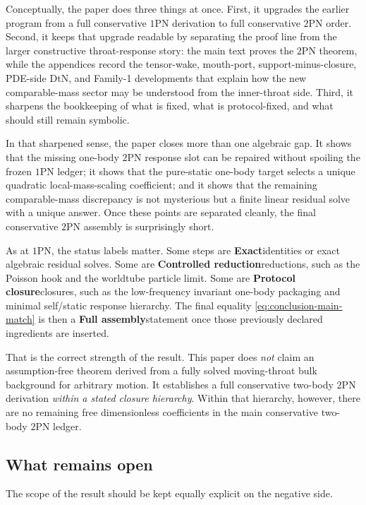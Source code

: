 \documentclass[11pt]{article}
\newcommand{\OnePN}{\mathrm{1PN}}
\newcommand{\TwoPN}{\mathrm{2PN}}
\newcommand{\DtN}{\mathrm{DtN}}
\newcommand{\Exact}{\textbf{Exact}}
\newcommand{\Controlled}{\textbf{Controlled reduction}}
\newcommand{\Protocol}{\textbf{Protocol closure}}
\newcommand{\FullMatch}{\textbf{Full assembly}}
\begin{document}
Conceptually, the paper does three things at once.
First, it upgrades the earlier program from a full conservative \(\OnePN\) derivation to
full conservative \(\TwoPN\) order.
Second, it keeps that upgrade readable by separating the proof line from the larger
constructive throat-response story: the main text proves the \(\TwoPN\) theorem, while
the appendices record the tensor-wake, mouth-port, support-minus-closure, PDE-side
\(\DtN\), and Family-1 developments that explain how the new comparable-mass sector may
be understood from the inner-throat side.
Third, it sharpens the bookkeeping of what is fixed, what is protocol-fixed, and what
should still remain symbolic.

In that sharpened sense, the paper closes more than one algebraic gap.
It shows that the missing one-body \(\TwoPN\) response slot can be repaired without
spoiling the frozen \(\OnePN\) ledger; it shows that the pure-static one-body target
selects a unique quadratic local-mass-scaling coefficient; and it shows that the
remaining comparable-mass discrepancy is not mysterious but a finite linear residual
solve with a unique answer.
Once these points are separated cleanly, the final conservative \(\TwoPN\) assembly is
surprisingly short.

As at \(\OnePN\), the status labels matter.
Some steps are \Exact identities or exact algebraic residual solves.
Some are \Controlled reductions, such as the Poisson hook and the worldtube particle
limit.
Some are \Protocol closures, such as the low-frequency invariant one-body packaging and
minimal self/static response hierarchy.
The final equality \cref{eq:conclusion-main-match} is then a \FullMatch statement once
those previously declared ingredients are inserted.

That is the correct strength of the result.
This paper does \emph{not} claim an assumption-free theorem derived from a fully solved
moving-throat bulk background for arbitrary motion.
It establishes a full conservative two-body \(\TwoPN\) derivation \emph{within a stated
closure hierarchy}.
Within that hierarchy, however, there are no remaining free dimensionless coefficients in
the main conservative two-body \(\TwoPN\) ledger.

\subsection{What remains open}
\label{sec:conclusion-open}

The scope of the result should be kept equally explicit on the negative side.
\end{document}
